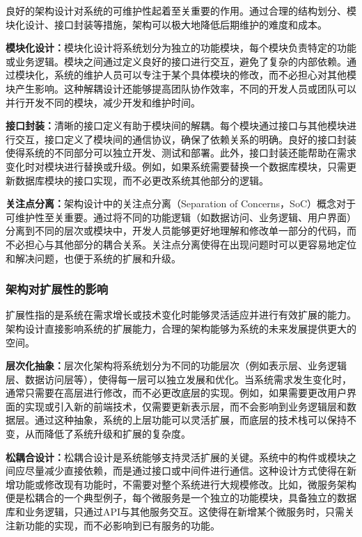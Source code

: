 良好的架构设计对系统的可维护性起着至关重要的作用。通过合理的结构划分、模块化设计、接口封装等措施，架构可以极大地降低后期维护的难度和成本。

\textbf{模块化设计：}模块化设计将系统划分为独立的功能模块，每个模块负责特定的功能或业务逻辑。模块之间通过定义良好的接口进行交互，避免了复杂的内部依赖。通过模块化，系统的维护人员可以专注于某个具体模块的修改，而不必担心对其他模块产生影响。这种解耦设计还能够提高团队协作效率，不同的开发人员或团队可以并行开发不同的模块，减少开发和维护时间。

\textbf{接口封装：}清晰的接口定义有助于模块间的解耦。每个模块通过接口与其他模块进行交互，接口定义了模块间的通信协议，确保了依赖关系的明确。良好的接口封装使得系统的不同部分可以独立开发、测试和部署。此外，接口封装还能帮助在需求变化时对模块进行替换或升级。例如，如果系统需要替换一个数据库模块，只需更新数据库模块的接口实现，而不必更改系统其他部分的逻辑。

\textbf{关注点分离：}架构设计中的关注点分离（Separation of Concerns，SoC）概念对于可维护性至关重要。通过将不同的功能逻辑（如数据访问、业务逻辑、用户界面）分离到不同的层次或模块中，开发人员能够更好地理解和修改单一部分的代码，而不必担心与其他部分的耦合关系。关注点分离使得在出现问题时可以更容易地定位和解决问题，也便于系统的扩展和升级。

\subsubsection{架构对扩展性的影响}

扩展性指的是系统在需求增长或技术变化时能够灵活适应并进行有效扩展的能力。架构设计直接影响系统的扩展能力，合理的架构能够为系统的未来发展提供更大的空间。

\textbf{层次化抽象：}层次化架构将系统划分为不同的功能层次（例如表示层、业务逻辑层、数据访问层等），使得每一层可以独立发展和优化。当系统需求发生变化时，通常只需要在高层进行修改，而不必更改底层的实现。例如，如果需要更改用户界面的实现或引入新的前端技术，仅需要更新表示层，而不会影响到业务逻辑层和数据层。通过这种抽象，系统的上层功能可以灵活扩展，而底层的技术栈可以保持不变，从而降低了系统升级和扩展的复杂度。

\textbf{松耦合设计：}松耦合设计是系统能够支持灵活扩展的关键。系统中的构件或模块之间应尽量减少直接依赖，而是通过接口或中间件进行通信。这种设计方式使得在新增功能或修改现有功能时，不需要对整个系统进行大规模修改。比如，微服务架构便是松耦合的一个典型例子，每个微服务是一个独立的功能模块，具备独立的数据库和业务逻辑，只通过API与其他服务交互。这使得在新增某个微服务时，只需关注新功能的实现，而不必影响到已有服务的功能。

